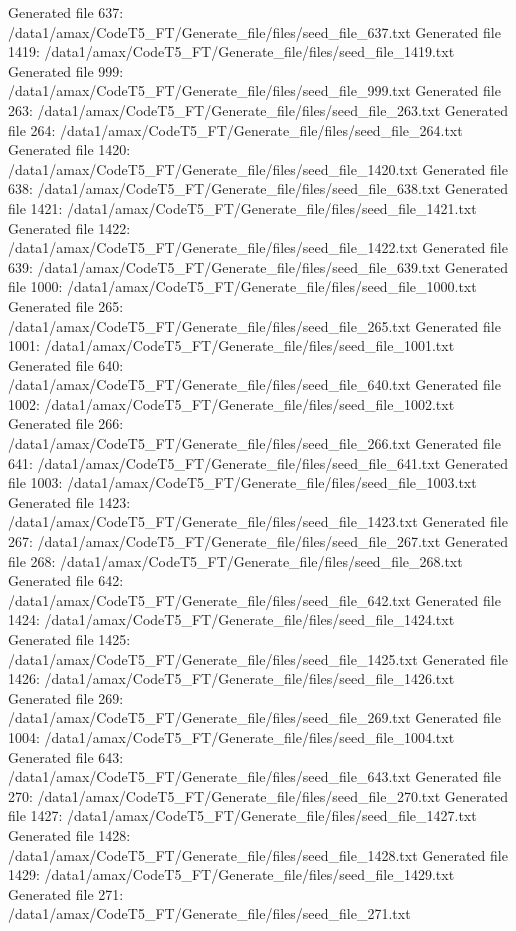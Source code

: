 Generated file 637: /data1/amax/CodeT5_FT/Generate_file/files/seed_file_637.txt
Generated file 1419: /data1/amax/CodeT5_FT/Generate_file/files/seed_file_1419.txt
Generated file 999: /data1/amax/CodeT5_FT/Generate_file/files/seed_file_999.txt
Generated file 263: /data1/amax/CodeT5_FT/Generate_file/files/seed_file_263.txt
Generated file 264: /data1/amax/CodeT5_FT/Generate_file/files/seed_file_264.txt
Generated file 1420: /data1/amax/CodeT5_FT/Generate_file/files/seed_file_1420.txt
Generated file 638: /data1/amax/CodeT5_FT/Generate_file/files/seed_file_638.txt
Generated file 1421: /data1/amax/CodeT5_FT/Generate_file/files/seed_file_1421.txt
Generated file 1422: /data1/amax/CodeT5_FT/Generate_file/files/seed_file_1422.txt
Generated file 639: /data1/amax/CodeT5_FT/Generate_file/files/seed_file_639.txt
Generated file 1000: /data1/amax/CodeT5_FT/Generate_file/files/seed_file_1000.txt
Generated file 265: /data1/amax/CodeT5_FT/Generate_file/files/seed_file_265.txt
Generated file 1001: /data1/amax/CodeT5_FT/Generate_file/files/seed_file_1001.txt
Generated file 640: /data1/amax/CodeT5_FT/Generate_file/files/seed_file_640.txt
Generated file 1002: /data1/amax/CodeT5_FT/Generate_file/files/seed_file_1002.txt
Generated file 266: /data1/amax/CodeT5_FT/Generate_file/files/seed_file_266.txt
Generated file 641: /data1/amax/CodeT5_FT/Generate_file/files/seed_file_641.txt
Generated file 1003: /data1/amax/CodeT5_FT/Generate_file/files/seed_file_1003.txt
Generated file 1423: /data1/amax/CodeT5_FT/Generate_file/files/seed_file_1423.txt
Generated file 267: /data1/amax/CodeT5_FT/Generate_file/files/seed_file_267.txt
Generated file 268: /data1/amax/CodeT5_FT/Generate_file/files/seed_file_268.txt
Generated file 642: /data1/amax/CodeT5_FT/Generate_file/files/seed_file_642.txt
Generated file 1424: /data1/amax/CodeT5_FT/Generate_file/files/seed_file_1424.txt
Generated file 1425: /data1/amax/CodeT5_FT/Generate_file/files/seed_file_1425.txt
Generated file 1426: /data1/amax/CodeT5_FT/Generate_file/files/seed_file_1426.txt
Generated file 269: /data1/amax/CodeT5_FT/Generate_file/files/seed_file_269.txt
Generated file 1004: /data1/amax/CodeT5_FT/Generate_file/files/seed_file_1004.txt
Generated file 643: /data1/amax/CodeT5_FT/Generate_file/files/seed_file_643.txt
Generated file 270: /data1/amax/CodeT5_FT/Generate_file/files/seed_file_270.txt
Generated file 1427: /data1/amax/CodeT5_FT/Generate_file/files/seed_file_1427.txt
Generated file 1428: /data1/amax/CodeT5_FT/Generate_file/files/seed_file_1428.txt
Generated file 1429: /data1/amax/CodeT5_FT/Generate_file/files/seed_file_1429.txt
Generated file 271: /data1/amax/CodeT5_FT/Generate_file/files/seed_file_271.txt
